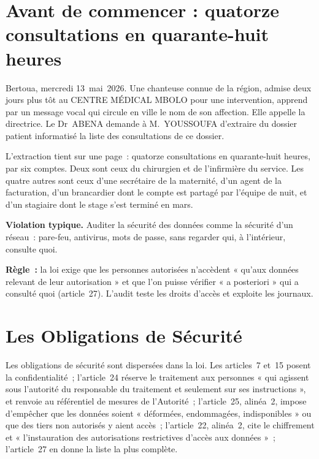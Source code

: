 \section*{Avant de commencer : quatorze consultations en quarante-huit heures}

Bertoua, mercredi 13~mai~2026. Une chanteuse connue de la région, admise
deux jours plus tôt au CENTRE MÉDICAL MBOLO pour une intervention, apprend
par un message vocal qui circule en ville le nom de son affection. Elle
appelle la directrice. Le Dr~ABENA demande à M.~YOUSSOUFA d'extraire du
dossier patient informatisé la liste des consultations de ce dossier.

L'extraction tient sur une page~: quatorze consultations en quarante-huit
heures, par six comptes. Deux sont ceux du chirurgien et de l'infirmière du
service. Les quatre autres sont ceux d'une secrétaire de la maternité, d'un
agent de la facturation, d'un brancardier dont le compte est partagé par
l'équipe de nuit, et d'un stagiaire dont le stage s'est terminé en mars.

\begin{boxalert}
\textbf{Violation typique.} Auditer la sécurité des données comme la sécurité
d'un réseau~: pare-feu, antivirus, mots de passe, sans regarder qui, à
l'intérieur, consulte quoi.

\smallskip
\textbf{Règle~:} la loi exige que les personnes autorisées n'accèdent
« qu'aux données relevant de leur autorisation » et que l'on puisse
vérifier « a posteriori » qui a consulté quoi (article~27). L'audit teste
les droits d'accès et exploite les journaux.
\end{boxalert}

\section{Les Obligations de Sécurité}
\label{sec:c07-obligations}

Les obligations de sécurité sont dispersées dans la loi. Les articles~7
et~15 posent la confidentialité~; l'article~24 réserve le traitement aux
personnes « qui agissent sous l'autorité du responsable du traitement et
seulement sur ses instructions », et renvoie au référentiel de mesures de
l'Autorité~; l'article~25, alinéa~2, impose d'empêcher que les données
soient « déformées, endommagées, indisponibles » ou que des tiers non
autorisés y aient accès~; l'article~22, alinéa~2, cite le chiffrement et
« l'instauration des autorisations restrictives d'accès aux données »~; l'article~27 en
donne la liste la plus complète.

